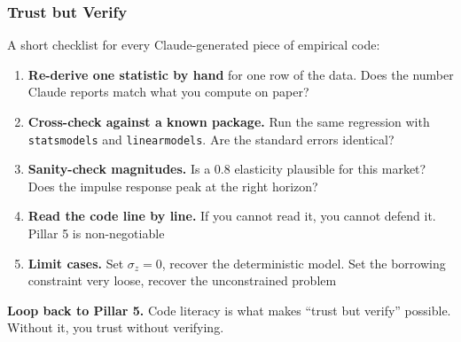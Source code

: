 \documentclass[10pt,english,aspectratio=169]{beamer}
\begin{document}
\begin{frame}
\frametitle{Trust but Verify}

A short checklist for every Claude-generated piece of empirical code:

\vspace{0.2cm}

\begin{enumerate}
    \item \textbf{Re-derive one statistic by hand} for one row of the data. Does the number Claude reports match what you compute on paper?
    \vspace{0.1cm}
    \item \textbf{Cross-check against a known package.} Run the same regression with \texttt{statsmodels} and \texttt{linearmodels}. Are the standard errors identical?
    \vspace{0.1cm}
    \item \textbf{Sanity-check magnitudes.} Is a 0.8 elasticity plausible for this market? Does the impulse response peak at the right horizon?
    \vspace{0.1cm}
    \item \textbf{Read the code line by line.} If you cannot read it, you cannot defend it. Pillar 5 is non-negotiable
    \vspace{0.1cm}
    \item \textbf{Limit cases.} Set $\sigma_z = 0$, recover the deterministic model. Set the borrowing constraint very loose, recover the unconstrained problem
\end{enumerate}

\vspace{0.3cm}

\textbf{Loop back to Pillar 5.} Code literacy is what makes ``trust but verify'' possible. Without it, you trust without verifying.
\end{frame}
\end{document}
